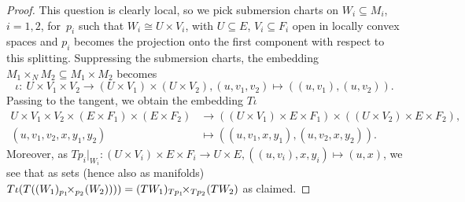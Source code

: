 \begin{proof}
This question is clearly local, so we pick submersion charts on $W_i \subseteq M_i$, $i=1,2$, for~$p_i$ such that $W_i \cong U \times V_i$, with $U\subseteq E$, $V_i \subseteq F_i$ open in locally convex spaces and $p_i$ becomes the projection onto the first component with respect to this splitting. Suppressing the submersion charts, the embedding $M_1\times_N M_2 \subseteq M_1 \times M_2$ becomes
\begin{displaymath}
 \iota \colon\ U \times V_1 \times V_2 \rightarrow (U\times V_1) \times (U \times V_2), (u,v_1,v_2) \mapsto ((u,v_1),(u,v_2)).
\end{displaymath}
Passing to the tangent, we obtain the embedding $T\iota$
\begin{align*}
 U \times V_1 \times V_2 \times (E \times F_1) \times (E\times F_2) &\rightarrow ((U\times V_1)\times E\times F_1)\times ((U\times V_2)\times E\times F_2),\\
 (u,v_1,v_2,x,y_1,y_2)&\mapsto ((u,v_1,x,y_1),(u,v_2,x,y_2) ).
\end{align*}
Moreover, as $Tp_i|_{W_i} \colon (U \times V_i) \times E \times F_i \rightarrow U\times E, ((u,v_i),x,y_i) \mapsto (u,x)$, we see that as sets (hence also as manifolds) $T\iota (T((W_1){}_{p_1}\hspace{-.4em}\times_{p_2} \hspace{-.2em} (W_2)) ) ) =(TW_1){}_{Tp_1}\hspace{-.4em}\times_{Tp_2}\hspace{-.2em}(TW_2)$ as claimed.
\end{proof}
